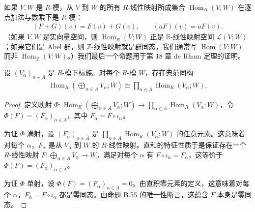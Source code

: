 \documentclass[../../main.tex]{subfiles}
\begin{document}
如果 $V,W$ 是 $R$-模，从 $V$ 到 $W$ 的所有 $R$-线性映射所成集合 $\operatorname{Hom}_R(V;W)$ 在逐点加法与数乘下是 $R$-模：
\begin{align*}
(F+G)(v)=F(v)+G(v),\qquad (aF)(v)=aF(v).
\end{align*}
（如果 $V,W$ 是实向量空间，则 $\operatorname{Hom}_R(V;W)$ 正是 $\mathbb R$-线性映射空间 $\mathcal L(V;W)$；如果它们是 Abel 群，则 $\mathbb Z$-线性映射就是群同态，我们通常写 $\operatorname{Hom}(V;W)$ 而非 $\operatorname{Hom}_{\mathbb Z}(V;W)$。）我们最后一个命题用于第 18 章 de Rham 定理的证明。

\begin{proposition}\label{proposition:appB-hom-direct-sum}
设 $(V_\alpha)_{\alpha\in A}$ 是 $R$-模下标族。对每个 $R$-模 $W$，存在典范同构
\begin{align*}
\operatorname{Hom}_R\left(\bigoplus_{\alpha\in A}V_\alpha;W\right)\cong\prod_{\alpha\in A}\operatorname{Hom}_R(V_\alpha;W).
\end{align*}
\end{proposition}

\begin{proof}
定义映射 $\Phi:\operatorname{Hom}_R\left(\bigoplus_{\alpha\in A}V_\alpha;W\right)\to\prod_{\alpha\in A}\operatorname{Hom}_R(V_\alpha;W)$，令 $\Phi(F)=(F_\alpha)_{\alpha\in A}$，其中 $F_\alpha=F\circ\iota_\alpha$。

为证 $\Phi$ 满射，设 $(F_\alpha)_{\alpha\in A}$ 是 $\prod_{\alpha\in A}\operatorname{Hom}_R(V_\alpha;W)$ 的任意元素。这意味着对每个 $\alpha$，$F_\alpha$ 是从 $V_\alpha$ 到 $W$ 的 $R$-线性映射。直和的特征性质于是保证存在一个 $R$-线性映射 $F:\bigoplus_{\alpha\in A}V_\alpha\to W$，满足对每个 $\alpha$ 有 $F\circ\iota_\alpha=F_\alpha$，这等价于 $\Phi(F)=(F_\alpha)_{\alpha\in A}$。

为证 $\Phi$ 单射，设 $\Phi(F)=(F_\alpha)_{\alpha\in A}=0$。由直积零元素的定义，这意味着对每个 $\alpha$，$F_\alpha=F\circ\iota_\alpha$ 都是零同态。由命题 B.55 的唯一性断言，这蕴含 $F$ 本身是零同态。
\end{proof}
\end{document}
